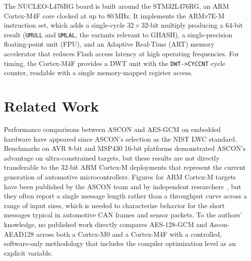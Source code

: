 The NUCLEO-L476RG board is built around the STM32L476RG, an ARM Cortex-M4F core
clocked at up to 80\,MHz.
It implements the ARMv7E-M instruction set, which adds a single-cycle
$32\times32$-bit multiply producing a 64-bit result (\texttt{UMULL} and
\texttt{UMLAL}, the variants relevant to GHASH), a single-precision
floating-point unit (FPU), and an Adaptive Real-Time (ART) memory accelerator
that reduces Flash access latency at high operating frequencies.
For timing, the Cortex-M4F provides a DWT unit with the \texttt{DWT->CYCCNT}
cycle counter, readable with a single memory-mapped register access.

\section{Related Work}

Performance comparisons between ASCON and AES-GCM on embedded hardware have
appeared since ASCON's selection as the NIST LWC standard.
Benchmarks on AVR 8-bit and MSP430 16-bit platforms demonstrated ASCON's
advantage on ultra-constrained targets, but these results are not directly
transferable to the 32-bit ARM Cortex-M deployments that represent the current
generation of automotive microcontrollers.
Figures for ARM Cortex-M targets have been published by the ASCON team and by
independent researchers~\cite{ASCONSoftware}, but they often report a single
message length rather than a throughput curve across a range of input sizes,
which is needed to characterize behavior for the short messages typical in
automotive CAN frames and sensor packets.
To the authors' knowledge, no published work directly compares AES-128-GCM and
Ascon-AEAD128 across both a Cortex-M0 and a Cortex-M4F with a controlled,
software-only methodology that includes the compiler optimization level as an
explicit variable.
